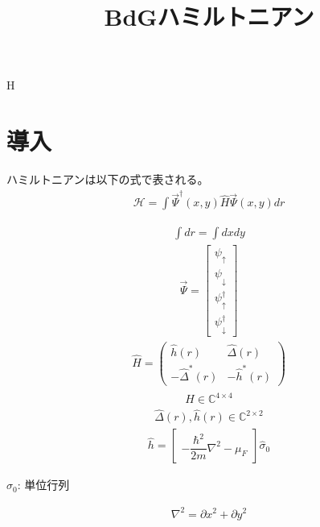 H\documentclass{jarticle}
\begin{document}
\title{BdGハミルトニアン}
\maketitle

\tableofcontents
\newpage
\section{導入}

ハミルトニアンは以下の式で表される。
\begin{align}
\mathcal{H}=\int\vec{\Psi}^\dagger(x,y)\hat{H}\vec{\Psi}(x,y)dr
\end{align}

\begin{align}
\int{dr}=\int{dxdy}
\end{align}
\begin{align}
\vec{\Psi}=\begin{bmatrix}
\psi_{\uparrow} \\
\psi_{\downarrow} \\
\psi_{\uparrow}^\dagger \\
\psi_{\downarrow}^\dagger
\end{bmatrix}
\end{align}
\begin{align}
\hat{H}=
\begin{pmatrix}
	\hat{h}(r) & \hat{\Delta}(r) \\
	-\hat{\Delta}^{*}(r) & -\hat{h}^{*}(r)
\end{pmatrix}
\end{align}
\begin{align}
\hat{H}\in\mathbb{C}^{4\times 4}
\end{align}
\begin{align}
\hat{\Delta}(r),\hat{h}(r)\in\mathbb{C}^{2\times 2}
\end{align}
\begin{align}
\hat{h}=
\begin{bmatrix}
-\dfrac{\hbar^2}{2m}\nabla^2-\mu_F
\end{bmatrix}
\hat{\sigma}_0
\end{align}
\begin{flushright}
$\hat{\sigma}_0$: 単位行列
\end{flushright}
\begin{align}
\nabla^2=\partial x^2+\partial y^2
\end{align}
\end{document}
